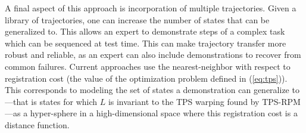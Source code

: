 A final aspect of this approach is incorporation of multiple trajectories. Given a library of trajectories,
one can increase the number of states that can be generalized to. This allows an expert to demonstrate steps of a complex task
which can be sequenced at test time. This can make trajectory transfer more robust and reliable, as an expert can also
include demonstrations to recover from common failures. Current approaches use the nearest-neighbor with respect to registration
cost (the value of the optimization problem defined in (\ref{eq:tps})). This corresponds to modeling the set of states a demonstration
can generalize to---that is states for which $L$ is invariant to the TPS warping found by TPS-RPM---as a hyper-sphere 
in a high-dimensional space where this registration cost is a distance function.


